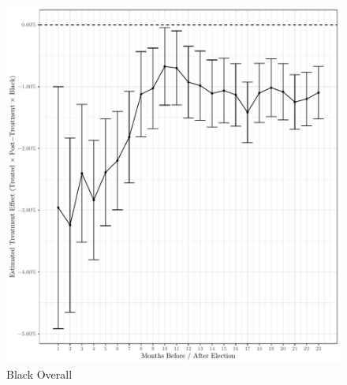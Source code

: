 \documentclass[
  12pt,
]{article}
\begin{document}
\begin{figure}[H]

{\centering \includegraphics{compile_files/figure-latex/black-overall-primary-1} 

}

\caption{\label{fig:did-1}Black Overall}\label{fig:black-overall-primary}
\end{figure}
\end{document}

